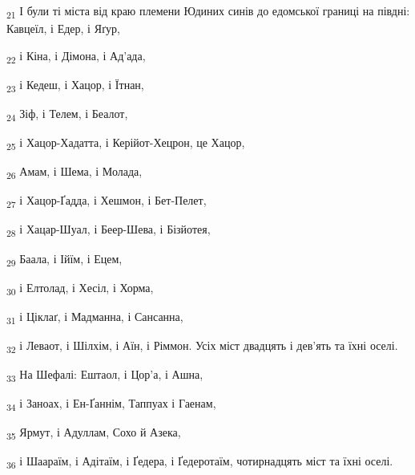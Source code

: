 \begin{tcolorbox}
\textsubscript{21} І були ті міста від краю племени Юдиних синів до едомської границі на півдні: Кавцеїл, і Едер, і Яґур,
\end{tcolorbox}
\begin{tcolorbox}
\textsubscript{22} і Кіна, і Дімона, і Ад'ада,
\end{tcolorbox}
\begin{tcolorbox}
\textsubscript{23} і Кедеш, і Хацор, і Їтнан,
\end{tcolorbox}
\begin{tcolorbox}
\textsubscript{24} Зіф, і Телем, і Беалот,
\end{tcolorbox}
\begin{tcolorbox}
\textsubscript{25} і Хацор-Хадатта, і Керійот-Хецрон, це Хацор,
\end{tcolorbox}
\begin{tcolorbox}
\textsubscript{26} Амам, і Шема, і Молада,
\end{tcolorbox}
\begin{tcolorbox}
\textsubscript{27} і Хацор-Ґадда, і Хешмон, і Бет-Пелет,
\end{tcolorbox}
\begin{tcolorbox}
\textsubscript{28} і Хацар-Шуал, і Беер-Шева, і Бізйотея,
\end{tcolorbox}
\begin{tcolorbox}
\textsubscript{29} Баала, і Ійїм, і Ецем,
\end{tcolorbox}
\begin{tcolorbox}
\textsubscript{30} і Елтолад, і Хесіл, і Хорма,
\end{tcolorbox}
\begin{tcolorbox}
\textsubscript{31} і Ціклаґ, і Мадманна, і Сансанна,
\end{tcolorbox}
\begin{tcolorbox}
\textsubscript{32} і Леваот, і Шілхім, і Аїн, і Ріммон. Усіх міст двадцять і дев'ять та їхні оселі.
\end{tcolorbox}
\begin{tcolorbox}
\textsubscript{33} На Шефалі: Ештаол, і Цор'а, і Ашна,
\end{tcolorbox}
\begin{tcolorbox}
\textsubscript{34} і Заноах, і Ен-Ґаннім, Таппуах і Гаенам,
\end{tcolorbox}
\begin{tcolorbox}
\textsubscript{35} Ярмут, і Адуллам, Сохо й Азека,
\end{tcolorbox}
\begin{tcolorbox}
\textsubscript{36} і Шаараїм, і Адітаїм, і Ґедера, і Ґедеротаїм, чотирнадцять міст та їхні оселі.
\end{tcolorbox}
